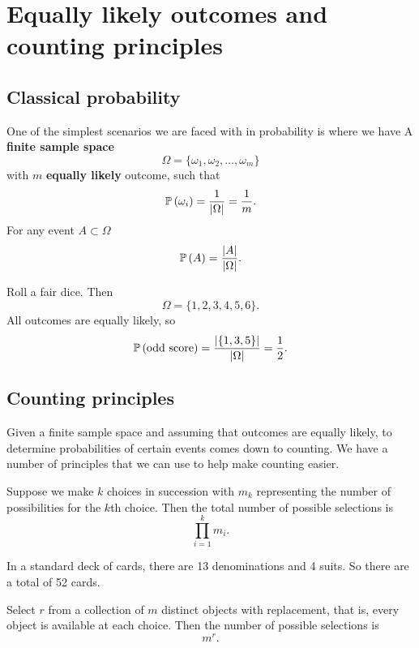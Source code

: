 \chapter{Equally likely outcomes and counting principles}

\section{Classical probability}

One of the simplest scenarios we are faced with in probability is where we have A \textbf{finite sample space} \[ \Omega = \{ \omega_1, \omega_2, \ldots, \omega_m \} \] with $m$ \textbf{equally likely} outcome, such that \[ \operatorname{\mathbb{P}}{(\omega_i)} = \frac{1}{\lvert\Omega\rvert} = \frac{1}{m}. \] For any event $A \subset \Omega$ \[ \operatorname{\mathbb{P}}{(A)} = \frac{\lvert A\rvert}{\lvert\Omega\rvert}. \]

\begin{example}
    Roll a fair dice. Then \[ \Omega = \{ 1, 2, 3, 4, 5, 6 \}. \] All outcomes are equally likely, so \[ \operatorname{\mathbb{P}}{(\text{odd score})} = \frac{\lvert\{ 1, 3, 5 \}\rvert}{\lvert\Omega\rvert} = \frac{1}{2}. \]
\end{example}

\section{Counting principles}

Given a finite sample space and assuming that outcomes are equally likely, to determine probabilities of certain events comes down to counting. We have a number of principles that we can use to help make counting easier.

\begin{proposition}
    Suppose we make $k$ choices in succession with $m_k$ representing the number of possibilities for the $k$th choice. Then the total number of possible selections is \[ \prod_{i = 1}^k m_i. \]
\end{proposition}

\begin{example}
    In a standard deck of cards, there are 13 denominations and 4 suits. So there are a total of 52 cards.
\end{example}

\begin{proposition}
    Select $r$ from a collection of $m$ distinct objects with replacement, that is, every object is available at each choice. Then the number of possible selections is \[ m^r. \]
\end{proposition}

